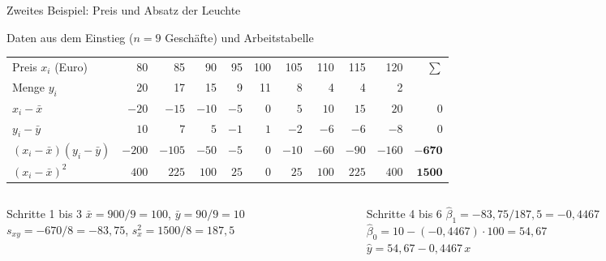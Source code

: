 \documentclass[aspectratio=169,11pt]{beamer}
\begin{document}
\begin{frame}{Zweites Beispiel: Preis und Absatz der Leuchte}
  \begin{block}{Daten aus dem Einstieg ($n = 9$ Geschäfte) und Arbeitstabelle}
    \begin{center}
      \scriptsize
      \renewcommand{\arraystretch}{1.05}
      \begin{tabular}{l*{9}{r}r}
        \toprule
        Preis $x_i$ (Euro)          & 80   & 85   & 90   & 95   & 100 & 105  & 110  & 115  & 120  & $\sum$ \\
        Menge $y_i$                 & 20   & 17   & 15   & 9    & 11  & 8    & 4    & 4    & 2    & \\
        \midrule
        $x_i - \bar{x}$             & $-20$ & $-15$ & $-10$ & $-5$ & $0$ & $5$ & $10$ & $15$ & $20$ & $0$ \\
        $y_i - \bar{y}$             & $10$ & $7$  & $5$  & $-1$ & $1$ & $-2$ & $-6$ & $-6$ & $-8$ & $0$ \\
        $(x_i-\bar{x})(y_i-\bar{y})$ & $-200$ & $-105$ & $-50$ & $-5$ & $0$ & $-10$ & $-60$ & $-90$ & $-160$ & $\mathbf{-670}$ \\
        $(x_i-\bar{x})^{2}$         & $400$ & $225$ & $100$ & $25$ & $0$ & $25$ & $100$ & $225$ & $400$ & $\mathbf{1500}$ \\
        \bottomrule
      \end{tabular}
    \end{center}
  \end{block}

  \begin{columns}[T]
    \begin{column}{0.5\textwidth}
      \begin{block}{Schritte 1 bis 3}
        \small
        $\bar{x} = 900/9 = 100$, \quad $\bar{y} = 90/9 = 10$ \\
        $s_{xy} = -670/8 = -83{,}75$, \quad $s_x^{2} = 1500/8 = 187{,}5$
      \end{block}
    \end{column}
    \begin{column}{0.48\textwidth}
      \begin{block}{Schritte 4 bis 6}
        \small
        $\hat{\beta}_1 = -83{,}75 / 187{,}5 = -0{,}4467$ \\
        $\hat{\beta}_0 = 10 - (-0{,}4467)\cdot 100 = 54{,}67$ \\
        $\hat{y} = 54{,}67 - 0{,}4467\,x$
      \end{block}
    \end{column}
  \end{columns}
\end{frame}
\end{document}
